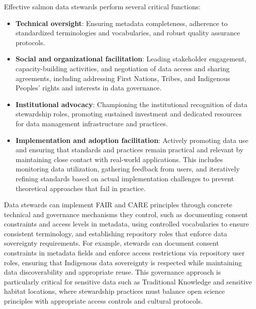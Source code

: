 \documentclass[
  letterpaper,
  DIV=11,
  numbers=noendperiod]{scrartcl}
\begin{document}
\begin{tcolorbox}[enhanced jigsaw, colback=white, titlerule=0mm, colbacktitle=quarto-callout-note-color!10!white, bottomrule=.15mm, leftrule=.75mm, left=2mm, breakable, rightrule=.15mm, bottomtitle=1mm, arc=.35mm, opacityback=0, title=\textcolor{quarto-callout-note-color}{\faInfo}\hspace{0.5em}{Box 1: Critical Functions of Salmon Data Stewards}, colframe=quarto-callout-note-color-frame, toptitle=1mm, toprule=.15mm, opacitybacktitle=0.6, coltitle=black]

Effective salmon data stewards perform several critical functions:

\begin{itemize}
\item
  \textbf{Technical oversight}: Ensuring metadata completeness,
  adherence to standardized terminologies and vocabularies, and robust
  quality assurance protocols.
\item
  \textbf{Social and organizational facilitation}: Leading stakeholder
  engagement, capacity-building activities, and negotiation of data
  access and sharing agreements, including addressing First Nations,
  Tribes, and Indigenous Peoples' rights and interests in data
  governance.
\item
  \textbf{Institutional advocacy}: Championing the institutional
  recognition of data stewardship roles, promoting sustained investment
  and dedicated resources for data management infrastructure and
  practices.
\item
  \textbf{Implementation and adoption facilitation}: Actively promoting
  data use and ensuring that standards and practices remain practical
  and relevant by maintaining close contact with real-world
  applications. This includes monitoring data utilization, gathering
  feedback from users, and iteratively refining standards based on
  actual implementation challenges to prevent theoretical approaches
  that fail in practice.
\end{itemize}

\end{tcolorbox}

Data stewards can implement FAIR and CARE principles through concrete
technical and governance mechanisms they control, such as documenting
consent constraints and access levels in metadata, using controlled
vocabularies to ensure consistent terminology, and establishing
repository roles that enforce data sovereignty requirements. For
example, stewards can document consent constraints in metadata fields
and enforce access restrictions via repository user roles, ensuring that
Indigenous data sovereignty is respected while maintaining data
discoverability and appropriate reuse. This governance approach is
particularly critical for sensitive data such as Traditional Knowledge
and sensitive habitat locations, where stewardship practices must
balance open science principles with appropriate access controls and
cultural protocols.
\end{document}
